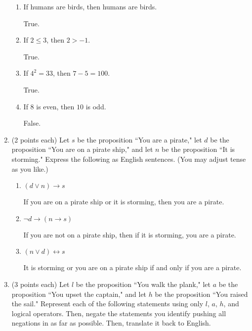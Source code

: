 \documentclass[11pt]{article}
\newcommand{\pte}[1]{\textcolor{maincolor}{(#1 points each)}}
\begin{document}
\begin{justify}
\begin{enumerate}
\begin{enumerate}
\item If humans are birds, then humans are birds.
\begin{mdframed}
    True.
\end{mdframed}
\item If $2 \leq 3$, then $2 > -1$.
\begin{mdframed}
   True. 
\end{mdframed}
\item If $4^2 = 33$, then $7-5=100$.
\begin{mdframed}
    True.
\end{mdframed}
\item If $8$ is even, then $10$ is odd.
\begin{mdframed}
    False.
\end{mdframed}
\end{enumerate}
\item \pte{2} Let $s$ be the proposition ``You are a pirate," let $d$ be the
proposition ``You are on a pirate ship," and let $n$ be the proposition ``It is
storming." Express the following as English sentences. (You may adjust tense as you
like.)
\begin{enumerate}
\item $(d \lor n) \rightarrow s$
\begin{mdframed}
    If you are on a pirate ship or it is storming, then you are a pirate.
\end{mdframed}
\item $\lnot d \rightarrow (n \rightarrow s)$
\begin{mdframed}
    If you are not on a pirate ship, then if it is storming, you are a pirate.
\end{mdframed}
\item $(n \lor d) \leftrightarrow s$
\begin{mdframed}
    It is storming or you are on a pirate ship if and only if you are a pirate.
\end{mdframed}
\end{enumerate}
\item \pte{3} Let $l$ be the proposition ``You walk the plank," let $a$ be the
proposition ``You upset the captain," and let $h$ be the proposition ``You raised
the sail." Represent each of the following statements using only $l$, $a$, $h$, and
logical operators. Then, negate the statements you identify pushing all negations
in as far as possible. Then, translate it back to English.
\begin{enumerate}

\end{enumerate}
\end{enumerate}
\end{justify}
\end{document}
